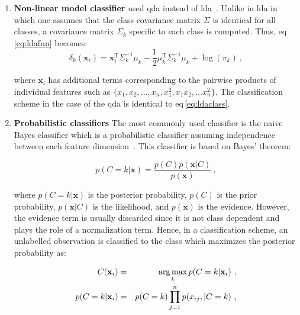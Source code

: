 \begin{enumerate}[leftmargin=*]
\item[] \textbf{Non-linear model classifier}
  \citeauthor{Viswanath2012} used \acf{qda} instead of
  \ac{lda}~\cite{Viswanath2012}.
  Unlike in \ac{lda} in which one assumes that the class covariance matrix
  $\Sigma$ is identical for all classes, a covariance matrix $\Sigma_k$
  specific to each class is computed.
  Thus, \acs{eq}\,\eqref{eq:ldafun} becomes:
  \begin{equation}
    \delta_{k}(\mathbf{x}_i) = \mathbf{x}_i^{\text{T}} \Sigma_{k}^{-1} \mu_k - \frac{1}{2} \mu_{k}^{\text{T}} \Sigma_{k}^{-1} \mu_k + \log (\pi_k) \ ,
    \label{eq:qdafun}
  \end{equation}

  \noindent where $\mathbf{x}_i$ has additional terms corresponding to the
  pairwise products of individual features such as $\{x_1, x_2, \dots , x_n,
  x_1^2, x_1x_2, \dots x_n^2\}$.
  The classification scheme in the case of the \ac{qda} is identical to
  \acs{eq}\,\eqref{eq:ldaclass}.

\item[] \textbf{Probabilistic classifiers}
  The most commonly used classifier is the naive Bayes classifier which is a
  probabilistic classifier assuming independence between each feature
  dimension~\cite{Rish2001}.
  This classifier is based on Bayes' theorem:

  \begin{equation}
    p(C=k|\mathbf{x}) = \frac{p(C)p(\mathbf{x}|C)}{p(\mathbf{x})} \ ,
    \label{eq:bayth}
  \end{equation}

  \noindent where $p(C=k|\mathbf{x})$ is the posterior probability, $p(C)$ is
  the prior probability, $p(\mathbf{x}|C)$ is the likelihood, and
  $p(\mathbf{x})$ is the evidence.
  However, the evidence term is usually discarded since it is not class
  dependent and plays the role of a normalization term.
  Hence, in a classification scheme, an unlabelled observation is classified to
  the class which maximizes the posterior probability as:

  \begin{eqnarray}
    C(\mathbf{x}_i) & = & \operatorname*{arg\,max}_k p(C=k|\mathbf{x}_i) \ , \label{eq:maxbay} \\
    p(C=k|\mathbf{x}_i) & = & p(C=k) \prod_{j=1}^{n} p(x_{ij},|C=k) \ , \label{eq:postbay}
  \end{eqnarray}


\end{enumerate}
